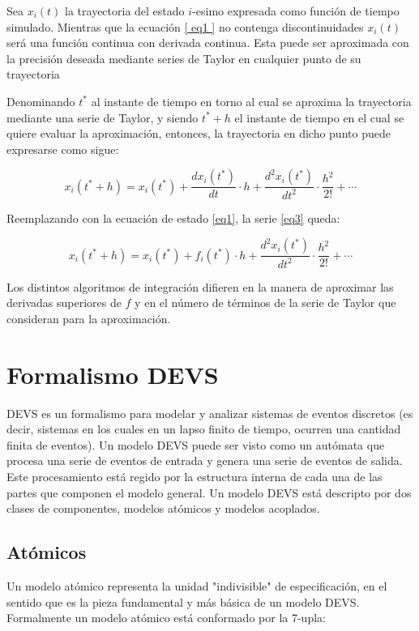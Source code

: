 \documentclass[a4paper,	11pt]{report}
\begin{document}
Sea $x_i (t)$ la trayectoria del estado $i$-esimo expresada como función de tiempo simulado. 
Mientras que la ecuación \eqref{ eq1 } no contenga discontinuidades $x_i (t)$ será una función continua con derivada continua. Esta puede ser aproximada con la precisión deseada mediante series de Taylor en cualquier punto de su trayectoria

Denominando $t^{\ast}$ al instante de tiempo en torno al cual se aproxima la trayectoria mediante una serie de Taylor, y siendo $t^{\ast} + h$ el instante de tiempo en el cual se quiere evaluar la aproximación, entonces, la trayectoria en dicho punto puede expresarse como sigue:

\begin{equation} \label{eq3}
x_i(t^* + h) = x_i(t^*) + \frac{dx_i (t^*)}{dt} \cdot h + \frac{d^{2}x_i (t^*)}{dt^2} \cdot \frac{h^2}{2!} + \cdots
\end{equation}

Reemplazando con la ecuación de estado \eqref{eq1}, la serie \eqref{eq3} queda:

\begin{equation} \label{eq4}
x_i(t^* + h) = x_i(t^*) + f_i(t^*) \cdot h + \frac{d^{2}x_i (t^*)}{dt^2} \cdot \frac{h^2}{2!} + \cdots
\end{equation}

Los distintos algoritmos de integración difieren en la manera de aproximar las derivadas superiores de $f$ y en el número de términos de la serie de Taylor que consideran para la aproximación.

\section{Formalismo DEVS}
DEVS es un formalismo para modelar y analizar sistemas de eventos discretos (es decir, sistemas en los cuales en un lapso finito de tiempo, ocurren una cantidad finita de eventos).
Un modelo DEVS puede ser visto como un autómata que procesa una serie de eventos de entrada y genera una serie de eventos de salida. Este procesamiento está regido por la estructura interna de cada una de las partes que componen el modelo general.
Un modelo DEVS está descripto por dos clases de componentes, modelos atómicos y modelos acoplados.

\subsection{Atómicos}
Un modelo atómico representa la unidad "indivisible" de especificación, en el sentido que es la pieza fundamental y más básica de un modelo DEVS. Formalmente un modelo atómico está conformado por la 7-upla:
\end{document}
